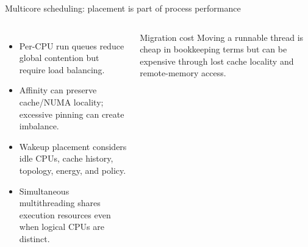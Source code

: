 \documentclass[aspectratio=169,11pt]{beamer}
\begin{document}
\begin{frame}{Multicore scheduling: placement is part of process performance}
  \small
  \begin{columns}[T,onlytextwidth]
      \centering
      \begin{itemize}
        \item Per-CPU run queues reduce global contention but require load balancing.
        \item Affinity can preserve cache/NUMA locality; excessive pinning can create imbalance.
        \item Wakeup placement considers idle CPUs, cache history, topology, energy, and policy.
        \item Simultaneous multithreading shares execution resources even when logical CPUs are distinct.
      \end{itemize}
      \begin{alertblock}{Migration cost}
        Moving a runnable thread is cheap in bookkeeping terms but can be expensive through lost cache locality and remote-memory access.
      \end{alertblock}
  \end{columns}
\end{frame}
\end{document}
